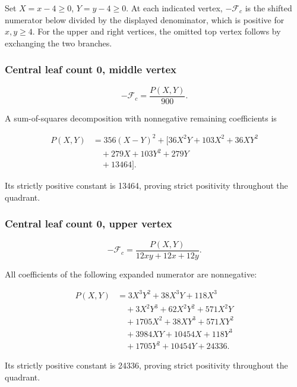 \documentclass[11pt,letterpaper]{article}
\theoremstyle{plain}
\begin{document}
Set \(X=x-4\ge0\), \(Y=y-4\ge0\). At each indicated vertex, \(-\mathcal F_c\) is the shifted numerator below divided by the displayed denominator, which is positive for \(x,y\ge4\). For the upper and right vertices, the omitted top vertex follows by exchanging the two branches.

\par\noindent\begin{minipage}{\linewidth}
\subsubsection*{Central leaf count 0, middle vertex}\label{central-leaf-count-0-middle-vertex}

\[
-\mathcal F_c=\frac{P(X,Y)}{900}.
\]

A sum-of-squares decomposition with nonnegative remaining coefficients is

\[
\begin{aligned}
P(X,Y)&=356 \left(X - Y\right)^{2}+\bigl[36 X^{2} Y + 103 X^{2} + 36 X Y^{2} \\
&\quad + 279 X + 103 Y^{2} + 279 Y \\
&\quad + 13464\bigr].
\end{aligned}
\]

Its strictly positive constant is 13464, proving strict positivity throughout the quadrant.
\end{minipage}\par\medskip

\par\noindent\begin{minipage}{\linewidth}
\subsubsection*{Central leaf count 0, upper vertex}\label{central-leaf-count-0-upper-vertex}

\[
-\mathcal F_c=\frac{P(X,Y)}{12 x y + 12 x + 12 y}.
\]

All coefficients of the following expanded numerator are nonnegative:

\[
\begin{aligned}
P(X,Y)&=3 X^{3} Y^{2} + 38 X^{3} Y + 118 X^{3} \\
&\quad + 3 X^{2} Y^{3} + 62 X^{2} Y^{2} + 571 X^{2} Y \\
&\quad + 1705 X^{2} + 38 X Y^{3} + 571 X Y^{2} \\
&\quad + 3984 X Y + 10454 X + 118 Y^{3} \\
&\quad + 1705 Y^{2} + 10454 Y + 24336.
\end{aligned}
\]

Its strictly positive constant is 24336, proving strict positivity throughout the quadrant.
\end{minipage}\par\medskip
\end{document}
